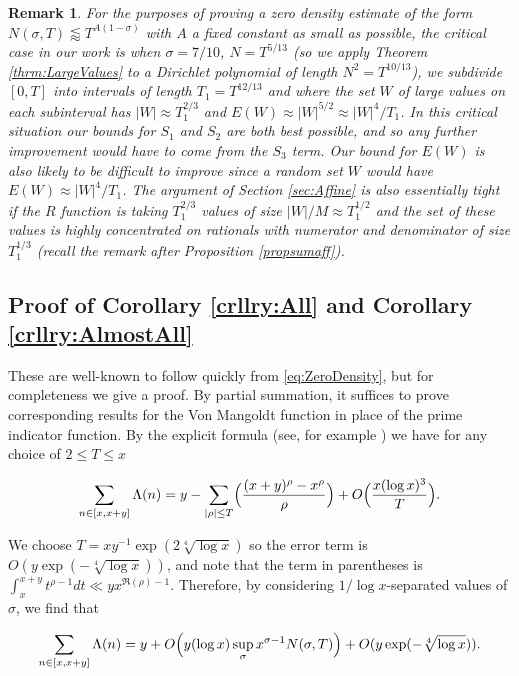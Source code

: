 \documentclass{amsart}
\theoremstyle{plain}
\newtheorem*{rmk}{Remark}
\numberwithin{equation}{section}
\begin{document}
\begin{rmk}For the purposes of proving a zero density estimate of the form $N(\sigma,T)\lessapprox T^{A(1-\sigma)}$ with $A$ a fixed constant as small as possible, the critical case in our work is when $\sigma=7/10$, $N=T^{5/13}$ (so we apply Theorem \ref{thrm:LargeValues} to a Dirichlet polynomial of length $N^2=T^{10/13}$), we subdivide $[0,T]$ into intervals of length $T_1=T^{12/13}$ and where the set $W$ of large values on each subinterval has $|W|\approx T_1^{2/3}$ and $E(W)\approx |W|^{5/2}\approx |W|^4/T_1$. In this critical situation our bounds for $S_1$ and $S_2$ are both best possible,  and so any further improvement would have to come from the $S_3$ term. Our bound for $E(W)$ is also likely to be difficult to improve since a random set $W$ would have $E(W)\approx |W|^4/T_1$. The argument of Section \ref{sec:Affine} is also essentially tight if the $R$ function is taking $T_1^{2/3}$ values of size $|W|/M\approx T_1^{1/2}$ and the set of these values is highly concentrated on rationals with numerator and denominator of size $T_1^{1/3}$ (recall the remark after Proposition \ref{propsumaff}).
\end{rmk}

%
%

\subsection{Proof of Corollary \ref{crllry:All} and Corollary \ref{crllry:AlmostAll}}

These are well-known to follow quickly from \eqref{eq:ZeroDensity}, but for completeness we give a proof. By partial summation, it suffices to prove corresponding results for the Von Mangoldt function in place of the prime indicator function. By the explicit formula (see, for example \cite[Chapter 17]{D}) we have for any choice of $2\le T\le x$

\[
\sum_{n\in [x,x+y]}\Lambda(n)=y-\sum_{|\rho|\le T}\Bigl(\frac{(x+y)^{\rho}-x^\rho}{\rho}\Bigr)+O\Bigl(\frac{x (\log{x})^3}{T}\Bigr).
\]

We choose $T=xy^{-1}\exp(2\sqrt[4]{\log{x}})$ so the error term is $O(y\exp(-\sqrt[4]{\log{x}}))$, and note that the term in parentheses is $\int_x^{x+y}t^{\rho-1}dt\ll yx^{\Re(\rho)-1}$. Therefore, by considering $1/\log{x}$-separated values of $\sigma$, we find that 

\[
\sum_{n\in [x,x+y]}\Lambda(n)=y+O\Bigl(y (\log{x}) \sup_{\sigma}x^{\sigma-1} N(\sigma,T)\Bigr)+O(y\exp(-\sqrt[4]{\log{x}})).
\]
\end{document}
